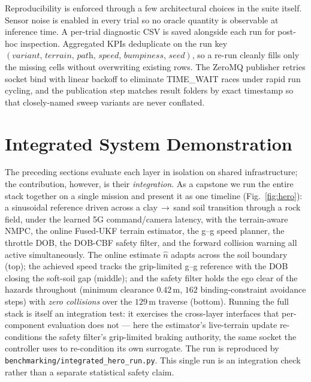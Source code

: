 \documentclass[conference,letterpaper,10pt]{IEEEtran}
\begin{document}
Reproducibility is enforced through a few architectural
choices in the suite itself. Sensor noise is enabled in every trial
so no oracle quantity is observable at inference time. A per-trial
diagnostic CSV is saved alongside each run for post-hoc inspection.
Aggregated KPIs deduplicate on the run key
$(\textit{variant},\,\textit{terrain},\,\textit{path},\,\textit{speed},\,
\textit{bumpiness},\,\textit{seed})$, so a re-run cleanly fills only
the missing cells without overwriting existing rows. The ZeroMQ
publisher retries socket bind with linear backoff to eliminate
TIME\_WAIT races under rapid run cycling, and the publication step
matches result folders by exact timestamp so that closely-named
sweep variants are never conflated.

\section{Integrated System Demonstration}
\label{sec:integrated}

The preceding sections evaluate each layer in isolation on shared
infrastructure; the contribution, however, is their \emph{integration}. As a
capstone we run the entire stack together on a single mission and present it as
one timeline (Fig.~\ref{fig:hero}): a sinusoidal reference driven across a
clay\,$\to$\,sand soil transition through a rock field, under the learned 5G
command/camera latency, with the terrain-aware NMPC, the online Fused-UKF
terrain estimator, the g--g speed planner, the throttle DOB, the DOB-CBF safety
filter, and the forward collision warning all active simultaneously. The online
estimate $\hat n$ adapts across the soil boundary (top); the achieved speed
tracks the grip-limited g--g reference with the DOB closing the soft-soil gap
(middle); and the safety filter holds the ego clear of the hazards throughout
(minimum clearance $0.42\,$m, $162$ binding-constraint avoidance steps) with
\emph{zero collisions} over the $129\,$m traverse (bottom). Running the full
stack is itself an integration test: it exercises the cross-layer interfaces
that per-component evaluation does not --- here the estimator's live-terrain
update re-conditions the safety filter's grip-limited braking authority, the
same socket the controller uses to re-condition its own surrogate. The run is
reproduced by \texttt{benchmarking/integrated\_hero\_run.py}. This single run
is an integration check rather than a separate statistical safety claim.
\end{document}
